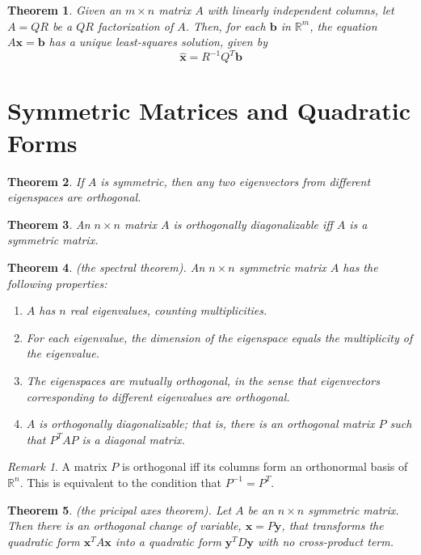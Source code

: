 \documentclass{article}
\theoremstyle{plain}
\newtheorem{thm}{Theorem}[section]
\theoremstyle{definition}
\theoremstyle{remark}
\newtheorem*{rem}{Remark}
\begin{document}
\begin{thm}
    Given an \(m\times n\) matrix \(A\) with linearly independent columns, let \(A=QR\) be a \(QR\) factorization of \(A\). Then, for each \(\textbf{b}\) in \(\mathbb{R}^m\), the equation \(A\textbf{x}=\textbf{b}\) has a unique least-squares solution, given by \[\hat{\textbf{x}}=R^{-1}Q^T\textbf{b}\]
\end{thm}

\section{Symmetric Matrices and Quadratic Forms}

\begin{thm}
    If \(A\) is symmetric, then any two eigenvectors from different eigenspaces are orthogonal.
\end{thm}

\begin{thm}
    An \(n\times n\) matrix \(A\) is orthogonally diagonalizable iff \(A\) is a symmetric matrix.
\end{thm}

\begin{thm} (the spectral theorem).
    An \(n \times n\) symmetric matrix \(A\) has the following properties:
    \begin{enumerate}
        \item[a.] \(A\) has \(n\) real eigenvalues, counting multiplicities.
        \item[b.] For each eigenvalue, the dimension of the eigenspace equals the multiplicity of the eigenvalue.
        \item[c.] The eigenspaces are mutually orthogonal, in the sense that eigenvectors corresponding to different eigenvalues are orthogonal.
        \item[d.] \(A\) is orthogonally diagonalizable; that is, there is an orthogonal matrix \(P\) such that \(P^TAP\) is a diagonal matrix.
    \end{enumerate}
\end{thm}

\begin{rem}
    A matrix \(P\) is orthogonal iff its columns form an orthonormal basis of \(\mathbb{R}^n\). This is equivalent to the condition that \(P^{-1}=P^T\).
\end{rem}

\begin{thm} (the pricipal axes theorem).
    Let \(A\) be an \(n\times n\) symmetric matrix. Then there is an orthogonal change of variable, \(\textbf{x}=P\textbf{y}\), that transforms the quadratic form \(\textbf{x}^TA\textbf{x}\) into a quadratic form \(\textbf{y}^TD\textbf{y}\) with no cross-product term.
\end{thm}
\end{document}
